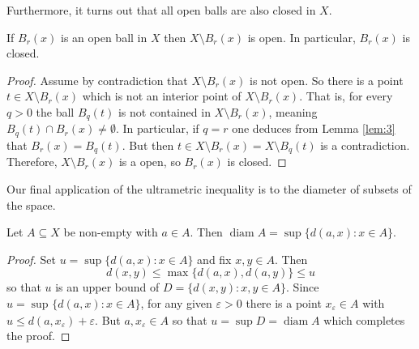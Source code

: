 Furthermore, it turns out that all open balls are also closed in \( X \).
\begin{lemma}
\label{lem:5}
If \( B_{r } (x) \) is an open ball in \( X \) then \( X \setminus  B_{r} (x) \) is open. In particular, \( B_{r} (x) \) is closed.
\end{lemma}
\begin{proof}
Assume by contradiction that \( X \setminus B_{r} (x) \) is not open. So there is a point \( t \in X \setminus B_{r} (x) \) which is not an interior point of \( X \setminus B_{r} (x) \). That is, for every \( q > 0 \) the ball \( B_{q} (t) \) is not contained in \( X \setminus B_{r} (x) \), meaning \( B_{q} (t) \cap B_{r} (x) \neq \emptyset  \). In particular, if \( q = r \) one deduces from Lemma \ref{lem:3} that \( B_{r} (x) = B_{q} (t) \). But then \( t \in X \setminus B_{r} (x) = X \setminus B_{q} (t) \) is a contradiction. Therefore, \( X \setminus B_{r} (x) \) is a open, so \( B_{r} (x) \) is closed.
\end{proof}
Our final application of the ultrametric inequality is to the diameter of subsets of the space.
\begin{lemma}
\label{lem:6}
Let \( A \subseteq X \) be non-empty with \( a \in A \). Then \( \operatorname{diam} A = \sup \{ d(a, x) : x \in A \}   \).
\end{lemma}
\begin{proof}
	Set \( u = \sup \{ d(a,x) : x \in A \}  \) and fix \( x,y \in A \). Then \[ d(x,y) \leq  \max \{ d(a,x), d(a,y) \} \leq u  \] so that \( u \) is an upper bound of \( D = \{ d(x,y) : x,y \in A \}  \). Since \( u = \sup_{} \{ d(a,x) : x \in A \}  \), for any given \( \varepsilon > 0 \) there is a point \( x_{\varepsilon } \in A \) with \( u \leq d(a, x_{\varepsilon }) + \varepsilon   \). But \( a, x_{\varepsilon } \in A \) so that \( u = \sup D = \operatorname{diam} A \) which completes the proof.
\end{proof}

